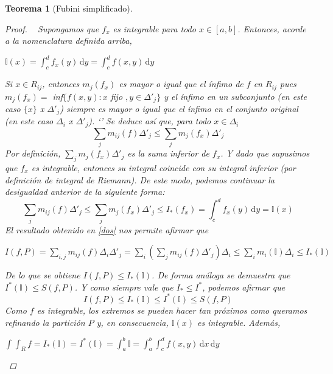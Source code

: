 \documentclass[]{article}
\newtheorem{teo}{Teorema}
\newcommand{\integral}[4]{\int_{#1}^{#2} \! #3 \, \mathrm{d}#4}
\newcommand{\intres}[3]{\int_{#1}^{#2} \! #3}
\newcommand{\dintegral}[7]{\int_{#1}^{#2} \! \int_{#3}^{#4} \! #5 \, \mathrm{d}#6 \, \mathrm{d}#7}
\newcommand{\dintres}[5]{\int_{#1}^{#2} \! \int_{#3}^{#4} \! #5}
\begin{document}
\begin{teo}[Fubini simplificado]
\begin{proof}
		~\newline
		Supongamos que $f_x$ es integrable para todo $x\in[a,b]$. Entonces, acorde a la nomenclatura definida arriba,
		\begin{center}
			$\displaystyle \mathds{I}(x) = \integral{c}{d}{f_x(y)}{y} = \integral{c}{d}{f(x,y)}{y}$
		\end{center}
		Si $x\in R_{ij}$, entonces $m_j(f_x)$ es mayor o igual que el ínfimo de $f$ en $R_{ij}$ pues $m_j(f_x) = $ inf$\{f(x,y):x$ fijo $, y\in\Delta'_j\}$ y el ínfimo en un subconjunto (en este caso $\{x\}$ x $\Delta'_j$) siempre es mayor o igual que el ínfimo en el conjunto original (en este caso $\Delta_i $ x $ \Delta'_j$).
`'
		Se deduce así que, para todo $x\in\Delta_i$
		\begin{equation*}
			\displaystyle \sum_j m_{ij}(f)\Delta'_j \leq \sum_j m_j(f_x)\Delta'_j
		\end{equation*}
		Por definición, $\displaystyle \sum_j m_j(f_x)\Delta'_j$ es la suma inferior de $f_x$. Y dado que supusimos que $f_x$ es integrable, entonces su integral coincide con su integral inferior (por definición de integral de Riemann). De este modo, podemos continuar la desigualdad anterior de la siguiente forma:
		\begin{equation}\label{dos}
			\displaystyle \sum_j m_{ij}(f)\Delta'_j \leq \sum_j m_j(f_x)\Delta'_j \leq I_*(f_x) = \integral{c}{d}{f_x(y)}{y} = \mathds{I}(x)
		\end{equation}
		El resultado obtenido en \eqref{dos} nos permite afirmar que
		\begin{center}
			$\displaystyle I(f,P) = \sum_{i,j}m_{ij}(f)\Delta_i \Delta'_j = \sum_i\left(\sum_j m_{ij}(f)\Delta'_j\right)\Delta_i \leq \sum_i m_i(\mathds{I})\Delta_i \leq I_*(\mathds{I})$
		\end{center}
		De lo que se obtiene $I(f,P)\leq I_*(\mathds{I})$. De forma análoga se demuestra que $I^*(\mathds{I}) \leq S(f,P)$. Y como siempre vale que $I_*\leq I^*$, podemos afirmar que
		\begin{equation*}
			I(f,P) \leq I_*(\mathds{I}) \leq I^*(\mathds{I}) \leq S(f,P)
		\end{equation*}
		Como $f$ es integrable, los extremos se pueden hacer tan próximos como queramos refinando la partición $P$ y, en consecuencia, $\mathds{I}(x)$ es integrable. Además,
		\begin{center}
			$\displaystyle \dintres{}{}{R}{}{f} = I_*(\mathds{I}) = I^*(\mathds{I}) = \intres{a}{b}{\mathds{I}} = \dintegral{a}{b}{c}{d}{f(x,y)}{x}{y}$
		\end{center}
	\end{proof}
\end{teo}
\end{document}
